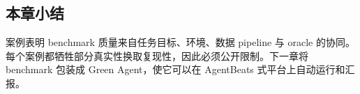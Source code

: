\subsection{本章小结}

案例表明 benchmark 质量来自任务目标、环境、数据 pipeline 与 oracle 的协同。每个案例都牺牲部分真实性换取复现性，因此必须公开限制。下一章将 benchmark 包装成 Green Agent，使它可以在 AgentBeats 式平台上自动运行和汇报。

